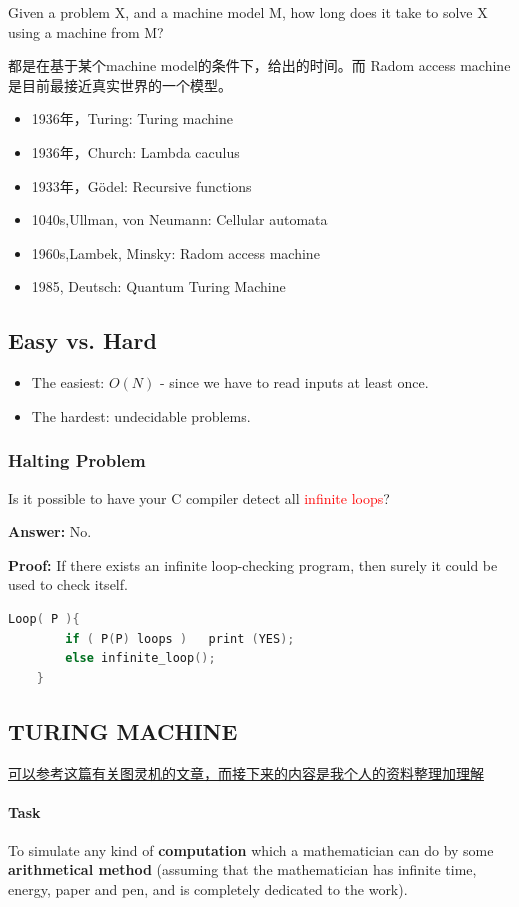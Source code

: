 \documentclass{article}
\begin{document}
Given a problem X, and a machine model M, how long does it take to solve X using a machine from M?
\par
都是在基于某个machine model的条件下，给出的时间。而 Radom access machine 是目前最接近真实世界的一个模型。
\begin{itemize}
    \item 1936年，Turing: Turing machine
    \item 1936年，Church: Lambda caculus
    \item 1933年，Gödel: Recursive functions
    \item 1040s,Ullman, von Neumann: Cellular automata
    \item 1960s,Lambek, Minsky: Radom access machine
    \item 1985, Deutsch: Quantum Turing Machine
\end{itemize}

\subsection{Easy vs. Hard}
\begin{itemize}
    \item The easiest: $O(N)$ - since we have to read inputs at least once.
    \item The hardest: undecidable problems.
\end{itemize}

\subsubsection{Halting Problem}
Is it possible to have your C compiler detect all \textcolor{red}{infinite loops}?\par
\textbf{Answer:} No.\par
\textbf{Proof:} If there exists an infinite loop-checking program, then surely it could be used to check itself.
\begin{lstlisting}[language = c]
    Loop( P ){  
        if ( P(P) loops )	print (YES);
        else infinite_loop();
    }
\end{lstlisting}

\subsection{TURING MACHINE}
\href{https://introcs.cs.princeton.edu/java/52turing/}{可以参考这篇有关图灵机的文章，而接下来的内容是我个人的资料整理加理解}

\paragraph{Task} To simulate any kind of \textbf{computation} which a mathematician can do by some \textbf{arithmetical method} (assuming that the mathematician has infinite time, energy, paper and pen, and is completely dedicated to the work).
\end{document}
